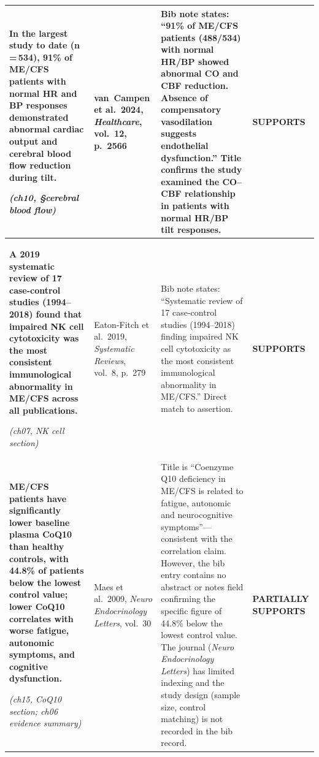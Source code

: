 \begin{longtable}{p{4.2cm}p{2.8cm}p{5.2cm}p{2.2cm}}
\raggedright
\textbf{In the largest study to date (n\,=\,534), 91\% of ME/CFS patients
with normal HR and BP responses demonstrated abnormal cardiac output
and cerebral blood flow reduction during tilt.}
\par\smallskip\textit{(ch10, \S{}cerebral blood flow)}
&
\cite{VanCampenEtAl2024}\par\smallskip
van~Campen et al.\ 2024, \textit{Healthcare}, vol.~12, p.~2566
&
Bib note states: ``91\% of ME/CFS patients (488/534) with normal
HR/BP showed abnormal CO and CBF reduction.  Absence of compensatory
vasodilation suggests endothelial dysfunction.''  Title confirms the
study examined the CO--CBF relationship in patients with normal HR/BP
tilt responses.
&
\textbf{SUPPORTS}\\
\midrule

\raggedright
\textbf{A 2019 systematic review of 17 case-control studies (1994--2018)
found that impaired NK cell cytotoxicity was the most consistent
immunological abnormality in ME/CFS across all publications.}
\par\smallskip\textit{(ch07, NK cell section)}
&
\cite{EatonFitch2019}\par\smallskip
Eaton-Fitch et al.\ 2019, \textit{Systematic Reviews}, vol.~8, p.~279
&
Bib note states: ``Systematic review of 17 case-control studies
(1994--2018) finding impaired NK cell cytotoxicity as the most
consistent immunological abnormality in ME/CFS.''  Direct match to
assertion.
&
\textbf{SUPPORTS}\\
\midrule

\raggedright
\textbf{ME/CFS patients have significantly lower baseline plasma CoQ10
than healthy controls, with 44.8\% of patients below the lowest
control value; lower CoQ10 correlates with worse fatigue, autonomic
symptoms, and cognitive dysfunction.}
\par\smallskip\textit{(ch15, CoQ10 section; ch06 evidence summary)}
&
\cite{Maes2009CoQ10}\par\smallskip
Maes et al.\ 2009, \textit{Neuro Endocrinology Letters}, vol.~30
&
Title is ``Coenzyme Q10 deficiency in ME/CFS is related to fatigue,
autonomic and neurocognitive symptoms''---consistent with the
correlation claim.  However, the bib entry contains no abstract or
notes field confirming the specific figure of 44.8\% below the
lowest control value.  The journal (\textit{Neuro Endocrinology
Letters}) has limited indexing and the study design (sample size,
control matching) is not recorded in the bib record.
&
\textbf{PARTIALLY SUPPORTS}\\
\midrule


\end{longtable}
